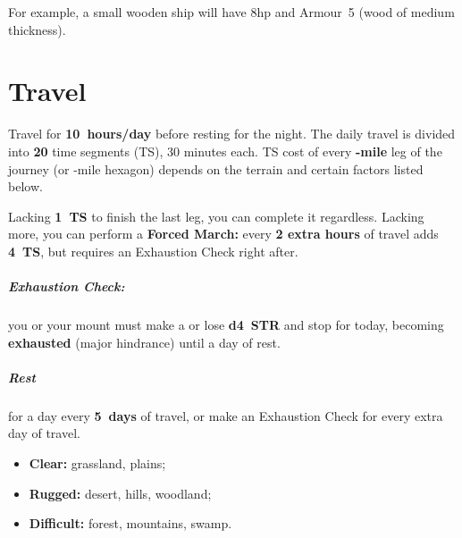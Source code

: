 \documentclass[itdr/core]{subfiles}
\begin{document}
For example, a small wooden ship will have 8hp and Armour~5 (wood of medium thickness).


\break


\cleartoleftpage

\newcommand{\tvspace}{\vspace{-0.25ex}}%

\section{Travel}
Travel for \textbf{10~hours/day} before resting for the night.
The daily travel is divided into \textbf{20} time segments (TS), 30 minutes each.
TS cost of every \textbf{-mile} leg of the journey (or -mile hexagon) depends on the terrain and certain factors listed below.

Lacking \textbf{1~TS} to finish the last leg, you can complete it regardless. Lacking more, you can perform a \textbf{Forced March:} every \textbf{2 extra hours} of travel adds \textbf{4~TS}, but requires an Exhaustion Check right after.

\tvspace

\subparagraph{Exhaustion Check:} you or your mount must make a  or lose \textbf{d4~STR} and stop for today, becoming \textbf{exhausted} (major hindrance) until a day of rest.\tight

\tvspace

\subparagraph{Rest} for a day every \textbf{5~days} of travel, or make an Exhaustion Check for every extra day of travel.


\tvspace

\begin{itemize}
	\item \textbf{Clear:} grassland, plains;
	\item \textbf{Rugged:} desert, hills, woodland;
	\item \textbf{Difficult:} forest, mountains, swamp.
\end{itemize}
\end{document}

